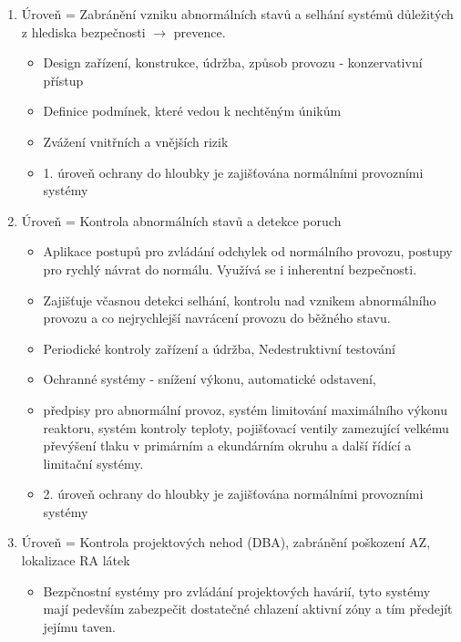 \begin{enumerate}
	\item Úroveň = Zabránění vzniku abnormálních stavů a selhání systémů důležitých z hlediska bezpečnosti $\rightarrow$ prevence.
        \begin{itemize}
            \item 	Design zařízení, konstrukce, údržba, způsob provozu - konzervativní přístup
            \item Definice podmínek, které vedou k nechtěným únikům 
            \item Zvážení vnitřních a vnějších rizik
            \item 1. úroveň ochrany do hloubky je zajišťována normálními provozními systémy
        \end{itemize}

	\item Úroveň = Kontrola abnormálních stavů a detekce poruch
        \begin{itemize}
            \item Aplikace postupů pro zvládání odchylek od normálního provozu, postupy pro rychlý návrat do normálu. Využívá se i inherentní bezpečnosti.

            \item Zajišťuje včasnou detekci selhání, kontrolu nad vznikem abnormálního provozu a co nejrychlejší navrácení provozu do běžného stavu.
            
            \item Periodické kontroly zařízení a údržba, Nedestruktivní testování

            \item Ochranné systémy - snížení výkonu, automatické odstavení, 

            \item předpisy pro abnormální provoz, systém limitování maximálního výkonu reaktoru, systém kontroly teploty, pojišťovací ventily zamezující velkému převýšení tlaku v primárním a  ekundárním okruhu a další řídící a limitační systémy.

            \item 2. úroveň ochrany do hloubky je zajišťována normálními provozními systémy
        \end{itemize}

	\item Úroveň =  Kontrola projektových nehod (DBA), zabránění poškození AZ, lokalizace RA látek
 
        \begin{itemize}
            \item Bezpčnostní systémy pro zvládání projektových havárií, tyto systémy mají pedevším zabezpečit dostatečné chlazení aktivní zóny a tím předejít jejímu taven.


\end{itemize}
\end{enumerate}
